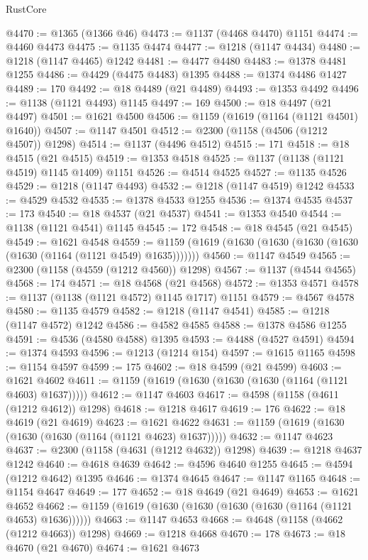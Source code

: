 \begin{lexlean}{RustCore}
\begin{coremodule}
@4470 := @1365 (@1366 @46)
@4473 := @1137 (@4468 @4470) @1151
@4474 := @4460 @4473
@4475 := @1135 @4474
@4477 := @1218 (@1147 @4434)
@4480 := @1218 (@1147 @4465) @1242
@4481 := @4477 @4480
@4483 := @1378 @4481 @1255
@4486 := @4429 (@4475 @4483) @1395
@4488 := @1374 @4486 @1427
@4489 := 170
@4492 := @18 @4489 (@21 @4489)
@4493 := @1353 @4492
@4496 := @1138 (@1121 @4493) @1145
@4497 := 169
@4500 := @18 @4497 (@21 @4497)
@4501 := @1621 @4500
@4506 := @1159 (@1619 (@1164 (@1121 @4501) @1640))
@4507 := @1147 @4501
@4512 := @2300 (@1158 (@4506 (@1212 @4507)) @1298)
@4514 := @1137 (@4496 @4512)
@4515 := 171
@4518 := @18 @4515 (@21 @4515)
@4519 := @1353 @4518
@4525 := @1137 (@1138 (@1121 @4519) @1145 @1409) @1151
@4526 := @4514 @4525
@4527 := @1135 @4526
@4529 := @1218 (@1147 @4493)
@4532 := @1218 (@1147 @4519) @1242
@4533 := @4529 @4532
@4535 := @1378 @4533 @1255
@4536 := @1374 @4535
@4537 := 173
@4540 := @18 @4537 (@21 @4537)
@4541 := @1353 @4540
@4544 := @1138 (@1121 @4541) @1145
@4545 := 172
@4548 := @18 @4545 (@21 @4545)
@4549 := @1621 @4548
@4559 := @1159 (@1619 (@1630 (@1630 (@1630 (@1630 (@1630 (@1164 (@1121 @4549) @1635)))))))
@4560 := @1147 @4549
@4565 := @2300 (@1158 (@4559 (@1212 @4560)) @1298)
@4567 := @1137 (@4544 @4565)
@4568 := 174
@4571 := @18 @4568 (@21 @4568)
@4572 := @1353 @4571
@4578 := @1137 (@1138 (@1121 @4572) @1145 @1717) @1151
@4579 := @4567 @4578
@4580 := @1135 @4579
@4582 := @1218 (@1147 @4541)
@4585 := @1218 (@1147 @4572) @1242
@4586 := @4582 @4585
@4588 := @1378 @4586 @1255
@4591 := @4536 (@4580 @4588) @1395
@4593 := @4488 (@4527 @4591)
@4594 := @1374 @4593
@4596 := @1213 (@1214 @154)
@4597 := @1615 @1165
@4598 := @1154 @4597
@4599 := 175
@4602 := @18 @4599 (@21 @4599)
@4603 := @1621 @4602
@4611 := @1159 (@1619 (@1630 (@1630 (@1630 (@1164 (@1121 @4603) @1637)))))
@4612 := @1147 @4603
@4617 := @4598 (@1158 (@4611 (@1212 @4612)) @1298)
@4618 := @1218 @4617
@4619 := 176
@4622 := @18 @4619 (@21 @4619)
@4623 := @1621 @4622
@4631 := @1159 (@1619 (@1630 (@1630 (@1630 (@1164 (@1121 @4623) @1637)))))
@4632 := @1147 @4623
@4637 := @2300 (@1158 (@4631 (@1212 @4632)) @1298)
@4639 := @1218 @4637 @1242
@4640 := @4618 @4639
@4642 := @4596 @4640 @1255
@4645 := @4594 (@1212 @4642) @1395
@4646 := @1374 @4645
@4647 := @1147 @1165
@4648 := @1154 @4647
@4649 := 177
@4652 := @18 @4649 (@21 @4649)
@4653 := @1621 @4652
@4662 := @1159 (@1619 (@1630 (@1630 (@1630 (@1630 (@1164 (@1121 @4653) @1636))))))
@4663 := @1147 @4653
@4668 := @4648 (@1158 (@4662 (@1212 @4663)) @1298)
@4669 := @1218 @4668
@4670 := 178
@4673 := @18 @4670 (@21 @4670)
@4674 := @1621 @4673

\end{coremodule}
\end{lexlean}
